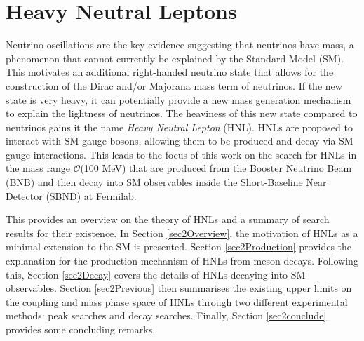 
\chapter{Heavy Neutral Leptons}
\label{ChapterHNL}

\ifpdf
    \graphicspath{{Chapter2/Figs/Raster/}{Chapter2/Figs/PDF/}{Chapter2/Figs/}}
\else
    \graphicspath{{Chapter2/Figs/Vector/}{Chapter2/Figs/}}
\fi


Neutrino oscillations are the key evidence suggesting that neutrinos have mass, a phenomenon that cannot currently be explained by the Standard Model (SM).
This motivates an additional right-handed neutrino state that allows for the construction of the Dirac and/or Majorana mass term of neutrinos.
If the new state is very heavy, it can potentially provide a new mass generation mechanism to explain the lightness of neutrinos.
The heaviness of this new state compared to neutrinos gains it the name \textit{Heavy Neutral Lepton} (HNL).
HNLs are proposed to interact with SM gauge bosons, allowing them to be produced and decay via SM gauge interactions.
This leads to the focus of this work on the search for HNLs in the mass range $\mathcal{O}$(100 MeV) that are produced from the Booster Neutrino Beam (BNB) and then decay into SM observables inside the Short-Baseline Near Detector (SBND) at Fermilab.

This provides an overview on the theory of HNLs and a summary of search results for their existence.  
In Section \ref{sec2Overview}, the motivation of HNLs as a minimal extension to the SM is presented.
Section \ref{sec2Production} provides the explanation for the production mechanism of HNLs from meson decays.
Following this, Section \ref{sec2Decay} covers the details of HNLs decaying into SM observables. 
Section \ref{sec2Previous} then summarises the existing upper limits on the coupling and mass phase space of HNLs through two different experimental methods: peak searches and decay searches.
Finally, Section \ref{sec2conclude} provides some concluding remarks.

